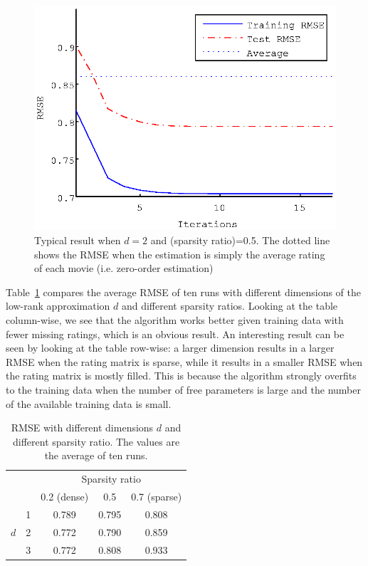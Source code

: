 \documentclass{article}
\begin{document}
\begin{figure}[ht]
  \begin{center}
    \includegraphics[scale=0.7]{figure/lrem_typical_plot}
  \end{center}
  \caption{Typical result when $d = 2$ and (sparsity ratio)=0.5. The dotted line shows the RMSE when the estimation is simply the average rating of each movie (i.e. zero-order estimation)}
  \label{fig:lrem_typical_plot}
\end{figure}

Table~\ref{table:lrem_result} compares the average RMSE of ten runs
with different dimensions of the low-rank approximation $d$ and
different sparsity ratios. Looking at the table column-wise, we see
that the algorithm works better given training data with fewer missing
ratings, which is an obvious result. An interesting result can be seen
by looking at the table row-wise: a larger dimension results in a
larger RMSE when the rating matrix is sparse, while it results in a
smaller RMSE when the rating matrix is mostly filled. This is because
the algorithm strongly overfits to the training data when the number
of free parameters is large and the number of the available training
data is small.

\begin{table}[ht]
 \caption{RMSE with different dimensions $d$ and different sparsity ratio. The values are the average of ten runs.}
 \label{table:lrem_result}
 \begin{center}
  \begin{tabular}{|c|c||c|c|c|}
    \hline
    \multicolumn{2}{|c|}{}  & \multicolumn{3}{|c|}{Sparsity ratio} \\
    \cline{3-5}
     \multicolumn{2}{|c|}{}    &  0.2 (dense)  &  0.5  & 0.7 (sparse)  \\
    \hline
    \hline
       & 1 &  0.789  &  0.795  &   0.808\\
    \cline{2-5}
     $d$ & 2 &  0.772  &  0.790  & 0.859\\
    \cline{2-5}
     & 3 &  0.772  &  0.808  &    0.933\\
    \hline
  \end{tabular}
 \end{center}
\end{table}
\end{document}
